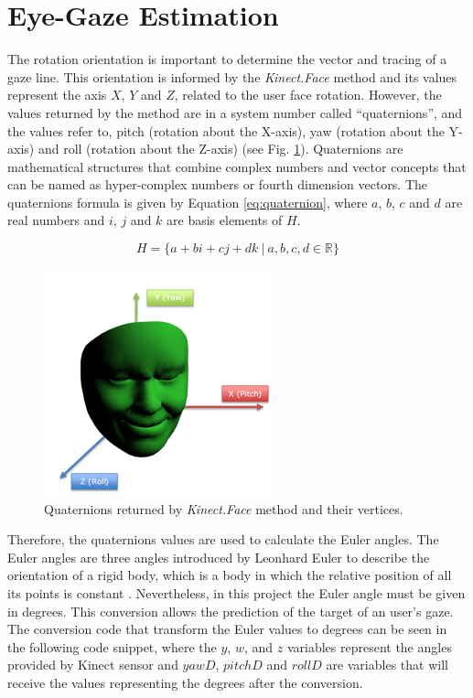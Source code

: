 \documentclass[10pt, conference]{IEEEtran}
\begin{document}
\section{Eye-Gaze Estimation} \label{sec:eyeGazeEstimation}

	The rotation orientation is important to determine the vector and tracing of a gaze line. 
	This orientation is informed by the \emph{Kinect.Face} method and its values represent the axis $X$, $Y$ and $Z$, related to the user face rotation. 
	However, the values returned by the method are in a system number called ``quaternions'', and the values refer to, pitch (rotation about the X-axis), yaw (rotation about the Y-axis) and roll (rotation about the Z-axis) (see Fig. \ref{fig:fig4}). 
	Quaternions are mathematical structures that combine complex numbers and vector concepts \cite{2,11} that can be named as hyper-complex numbers or fourth dimension vectors. 
	The quaternions formula is given by Equation \ref{eq:quaternion}, where $a$, $b$, $c$ and $d$ are real numbers and $i$, $j$ and $k$ are basis elements of $H$.
    
    \begin{equation}
		H = \{a+ bi + cj + dk ~ \vert ~ a, b, c, d \in \mathbb{R} \}
        \label{eq:quaternion}
	\end{equation}

\begin{figure}[t]
	\centering
	\includegraphics{figures/pic4.png}
    \caption{Quaternions returned by \emph{Kinect.Face} method and their vertices.}
    \label{fig:fig4}
\end{figure}

	Therefore, the quaternions values are used to calculate the Euler angles. 
	The Euler angles are three angles introduced by Leonhard Euler to describe the orientation of a rigid body, which is a body in which the relative position of all its points is constant \cite{12}. 
	Nevertheless, in this project the Euler angle must be given in degrees.
    This conversion allows the prediction of the target of an user's gaze.
	The conversion code that transform the Euler values to degrees can be seen in the following code snippet, where the $y$, $w$, and $z$ variables represent the angles provided by Kinect sensor and $yawD$, $pitchD$ and $rollD$ are variables that will receive the values representing the degrees after the conversion.
    
\end{document}

